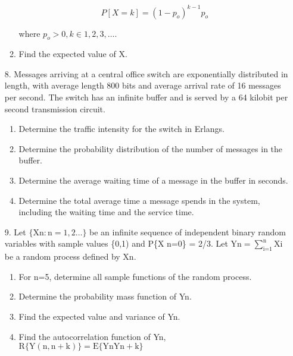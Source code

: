 \documentclass[main.tex]{subfiles}
\begin{document}
\begin{enumerate}
\begin{enumerate}
        $$
        P[X = k] = (1-p_o)^{k-1}p_o
        $$

        where $p_o>0, k \in 1,2,3,\dots$.
        
        \item Find the expected value of X.
    \end{enumerate}
    
\item [8.] Messages arriving at a central office switch are exponentially distributed in length, with average length 800 bits and average arrival rate of 16 messages per second. The switch has an infinite buffer and is served by a 64 kilobit per second transmission circuit.

    \begin{enumerate}
        \item Determine the traffic intensity for the switch in Erlangs.
        \item Determine the probability distribution of the number of messages in the buffer.
        \item Determine the average waiting time of a message in the buffer in seconds.
        \item Determine the total average time a message spends in the system, including the waiting time and the service time.
    \end{enumerate}

\item [9.] Let $\{\mathrm{Xn}: \mathrm{n}=1,2 \ldots\}$ be an infinite sequence of independent binary random variables with sample values \{0,1) and P\{X n=0\} = 2/3. Let $\text{Yn}=\sum_{\text{i=1}}^{\text{n}} \text{Xi}$ be a random process defined by Xn.

    \begin{enumerate}
        \item For n=5, determine all sample functions of the random process.
        \item Determine the probability mass function of Yn.
        \item Find the expected value and variance of Yn.
        \item Find the autocorrelation function of Yn, $\mathrm{R}\{\mathrm{Y}(\mathrm{n}, \mathrm{n}+\mathrm{k})\}=\mathrm{E}\{\mathrm{Yn} \mathrm{Yn}+\mathrm{k}\}$
    \end{enumerate}
    
\end{enumerate}
\end{document}
